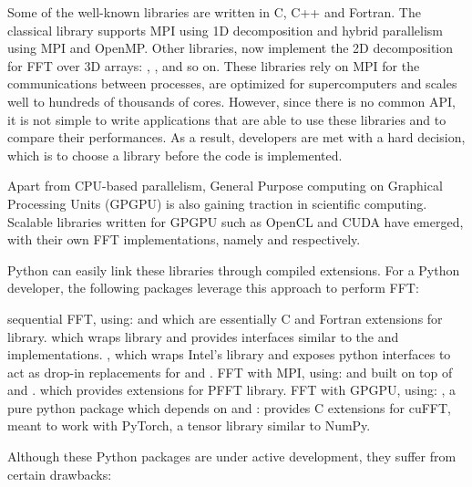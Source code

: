 Some of the well-known libraries are written in C, C++ and Fortran. The classical
 library supports MPI using 1D decomposition and hybrid parallelism
using MPI and OpenMP. Other libraries, now implement the 2D decomposition for
FFT over 3D arrays:  \citep{pippig_pfft2013}, 
\citep{pekurovsky2012p3dfft},  and so on. These libraries
rely on MPI for the communications between processes, are optimized for
supercomputers and scales well to hundreds of thousands of cores. However, since
there is no common API, it is not simple to write applications that are able to
use these libraries and to compare their performances. As a result, developers are
met with a hard decision, which is to choose a library before the code is
implemented.

Apart from CPU-based parallelism, General Purpose computing on Graphical
Processing Units (GPGPU) is also gaining traction in scientific computing.
Scalable libraries written for GPGPU such as OpenCL and CUDA have emerged, with
their own FFT implementations, namely  and 
respectively.

Python can easily link these libraries through compiled extensions. For a Python
developer, the following packages leverage this approach to perform FFT:

\begin{outline}
  \1 sequential FFT, using:
    \2  and  which are essentially
    C and Fortran extensions for  library.
    \2  which wraps  library and provides interfaces similar to
    the  and  implementations.
    \2 , which wraps Intel's  library and exposes python
    interfaces to act as drop-in replacements for  and
    .
  \1 FFT with MPI, using:
    \2  and  built on top of  and
    .
    \2  which provides extensions for
    PFFT library.
  \1 FFT with GPGPU, using:
    \2 , a pure python package which depends on 
    and 
    \2 : provides C extensions for cuFFT, meant to work with
    PyTorch, a tensor library similar to NumPy.
\end{outline}

Although these Python packages are under active development, they suffer from
certain drawbacks:

